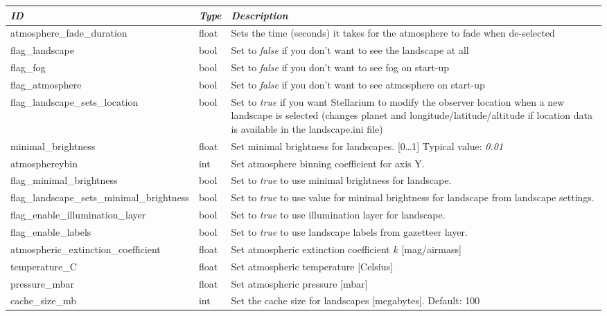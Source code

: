 \begin{longtable}{l|l|p{68mm}}\toprule
\emph{ID}                            & \emph{Type} & \emph{Description}\\\midrule
atmosphere\_fade\_duration                 & float & Sets the time (seconds) it takes for the atmosphere to fade when de-selected\\%
flag\_landscape                            & bool  & Set to \emph{false} if you don't want to see the landscape at all\\%
flag\_fog                                  & bool  & Set to \emph{false} if you don't want to see fog on start-up\\%
flag\_atmosphere                           & bool  & Set to \emph{false} if you don't want to see atmosphere on start-up\\%
flag\_landscape\_sets\_location            & bool  & Set to \emph{true} if you want Stellarium to modify the observer location 
                                                     when a new landscape is selected (changes planet and longitude/latitude/altitude 
                                                     if location data is available in the landscape.ini file)\\%
minimal\_brightness                        & float & Set minimal brightness for landscapes. [0\ldots1] Typical value: \emph{0.01}\\%
atmosphereybin						       & int   & Set atmosphere binning coefficient for axis Y.\\%
flag\_minimal\_brightness                  & bool  & Set to \emph{true} to use minimal brightness for landscape.\\%
flag\_landscape\_sets\_minimal\_brightness & bool  & Set to \emph{true} to use value for minimal brightness for landscape from landscape settings.\\%
flag\_enable\_illumination\_layer          & bool  & Set to \emph{true} to use illumination layer for landscape.\\%
flag\_enable\_labels                       & bool  & Set to \emph{true} to use landscape labels from gazetteer layer.\\%
atmospheric\_extinction\_coefficient       & float & Set atmospheric extinction coefficient $k$ [mag/airmass]\\%
temperature\_C                             & float & Set atmospheric temperature [Celsius]\\%
pressure\_mbar                             & float & Set atmospheric pressure [mbar]\\%
cache\_size\_mb                            & int   & Set the cache size for landscapes [megabytes]. Default: 100\\\bottomrule
\end{longtable}

